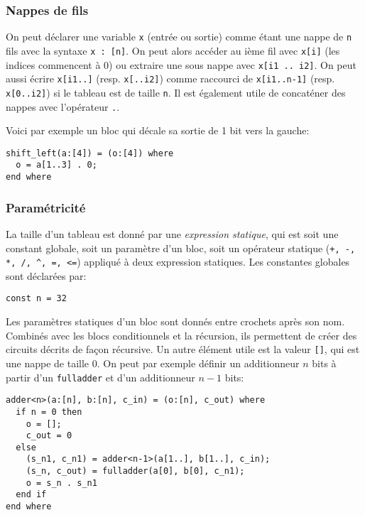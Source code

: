 \documentclass[a4paper]{article}
\begin{document}
\subsubsection*{Nappes de fils}

On peut déclarer une variable \lstinline+x+ (entrée ou sortie) comme étant 
une nappe de \lstinline+n+ fils avec la syntaxe \lstinline+x : [n]+. On peut 
alors accéder au ième fil avec \lstinline+x[i]+ (les indices commencent à 0) 
ou extraire une sous nappe avec \lstinline+x[i1 .. i2]+. On peut aussi 
écrire \lstinline+x[i1..]+ (resp. \lstinline+x[..i2]+) comme raccourci de 
\lstinline+x[i1..n-1]+ (resp. \lstinline+x[0..i2]+) si le tableau est de 
taille \texttt{n}. Il est également utile de concaténer des nappes avec 
l'opérateur \lstinline+.+. 

Voici par exemple un bloc qui décale sa sortie de 1 bit vers la gauche:
\begin{lstlisting}
shift_left(a:[4]) = (o:[4]) where
  o = a[1..3] . 0;
end where
\end{lstlisting}


\subsubsection*{Paramétricité}
\label{ref:static}

La taille d'un tableau est donné par une \emph{expression statique}, qui est soit une constant globale, soit un paramètre d'un bloc, soit un opérateur statique (\lstinline{+, -, *, /, ^, =, <=}) appliqué à deux expression statiques. Les constantes globales sont déclarées par:
\begin{lstlisting}
const n = 32
\end{lstlisting}

Les paramètres statiques d'un bloc sont donnés entre crochets après son nom. Combinés avec les blocs conditionnels et la récursion, ils permettent de créer des circuits décrits de façon récursive. Un autre élément utile est la valeur \lstinline+[]+, qui est une nappe de taille 0. On peut par exemple définir un additionneur $n$ bits à partir d'un \texttt{fulladder} et d'un additionneur $n-1$ bits:
\begin{lstlisting}
adder<n>(a:[n], b:[n], c_in) = (o:[n], c_out) where
  if n = 0 then
    o = [];
    c_out = 0
  else
    (s_n1, c_n1) = adder<n-1>(a[1..], b[1..], c_in);
    (s_n, c_out) = fulladder(a[0], b[0], c_n1);
    o = s_n . s_n1
  end if
end where
\end{lstlisting}
\end{document}
